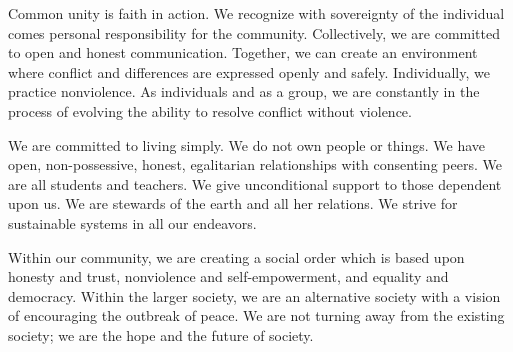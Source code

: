 Common unity is faith in action. We recognize with sovereignty of the individual comes personal responsibility for the community. Collectively, we are committed to open and honest communication. Together, we can create an environment where conflict and differences are expressed openly and safely. Individually, we practice nonviolence. As individuals and as a group, we are constantly in the process of evolving the ability to resolve conflict without violence.

We are committed to living simply. We do not own people or things. We have open, non-possessive, honest, egalitarian relationships with consenting peers. We are all students and teachers. We give unconditional support to those dependent upon us. We are stewards of the earth and all her relations. We strive for sustainable systems in all our endeavors.

Within our community, we are creating a social order which is based upon honesty and trust, nonviolence and self-empowerment, and equality and democracy. Within the larger society, we are an alternative society with a vision of encouraging the outbreak of peace. We are not turning away from the existing society; we are the hope and the future of society. 
